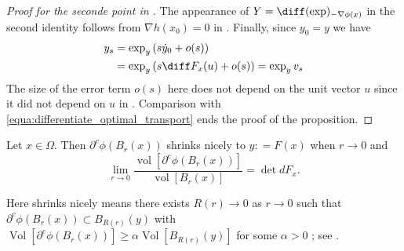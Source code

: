 \begin{proof}[Proof for the seconde point in ]
	The appearance of \( Y = \diff ( \exp ) _ { - \nabla \phi ( x ) } \) in the second identity follows from
	\( \nabla h \left( x _ { 0 } \right) = 0 \) in .
	Finally, since \( y _ { 0 } = y \) we have
	\begin{align*}
		y _ { s } & = \exp _ { y } \left( s \dot { y } _ { 0 } + o ( s ) \right)                             \\
		          & = \exp _ { y } \left( s \diff F _ { x } ( u ) + o ( s ) \right) = \exp _ { y } v _ { s }
	\end{align*}
	The size of the error term \( o ( s ) \) here does not depend on the unit vector \( u \)
	since it did not depend on \( u \) in .
	Comparison with \cref{equa:differentiate_optimal_transport} ends the proof
	of the proposition.
\end{proof}

\begin{lem}
	Let \( x \in \Omega \).
	Then \( \partial ^ { c } \phi \left( B _ { r } ( x ) \right) \) shrinks nicely to \( y : = F ( x ) \) when \( r \rightarrow 0 \) and
	\[ \lim _ { r \rightarrow 0 } \frac { \operatorname { vol } \left[ \partial ^ { c } \phi \left( B _ { r } ( x ) \right) \right] } { \operatorname { vol } \left[ B _ { r } ( x ) \right] } = \operatorname { det } d F _ { x } .\]
\end{lem}

Here shrinks nicely means there exists \( R ( r ) \rightarrow 0 \) as \( r \rightarrow 0 \) such that
\( \partial ^ { c } \phi \left( B _ { r } ( x ) \right) \subset B _ { R ( r ) } ( y ) \)
with  \( \operatorname{Vol} \left[\partial^c \phi (B_r (x)) \right] \geq
\alpha \operatorname{Vol} \left[ B _ { R ( r ) } ( y ) \right]\)
for some $\alpha >0$ ; see \cite[140]{Rudin1987real}.
